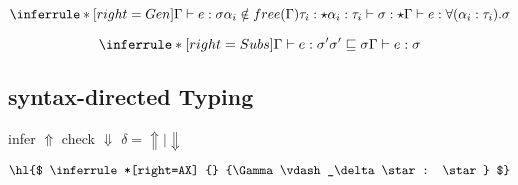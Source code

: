 \[
\inferrule*[right=Gen]
{\judge e : \sigma \\
\alpha_i \notin free(\Gamma) \\
\tau_i : \star \\
\alpha_i : \tau_i \vdash \sigma : \star}
{\judge e : \forall(\alpha_i : \tau_i). \sigma }
\]

\[
\inferrule*[right=Subs]
{\judge e : \sigma' \\ \sigma' \sqsubseteq \sigma} {\judge e : \sigma }
\]




\clearpage

\subsection{syntax-directed Typing}

\newcommand{\checktype}{\Gamma\vdash_\Downarrow}
\newcommand{\infertype}{\Gamma\vdash_\Uparrow}
\newcommand{\infercheck}{\Gamma\vdash_\delta}

\newcommand{\checktypeno}{\vdash_\Downarrow}
\newcommand{\infertypeno}{\vdash_\Uparrow}
\newcommand{\infercheckno}{\vdash_\delta}

\newcommand{\instinfer}{\vdash^{inst}_\Uparrow}
\newcommand{\instcheck}{\vdash^{inst}_\Downarrow}
\newcommand{\instinfercheck}{\vdash^{inst}_\delta}

\newcommand{\polyinfer}{\Gamma\vdash^{poly}_\Uparrow}
\newcommand{\polycheck}{\Gamma\vdash^{poly}_\Downarrow}
\newcommand{\polycheckno}{\vdash^{poly}_\Downarrow}
\newcommand{\polyinfercheck}{\vdash^{poly}_\delta}

\newcommand{\polymorphic}{\vdash^{dsk}}
\newcommand{\polymorphicstar}{\vdash^{dsk\star}}



\framebox{$ \infercheck e : \rho$ } infer $\Uparrow$ check $\Downarrow$ $\delta = \Uparrow \mid \Downarrow$

\[
\hl{$
\inferrule*[right=AX]
{} {\infercheck \star : \star}
$}
\]

